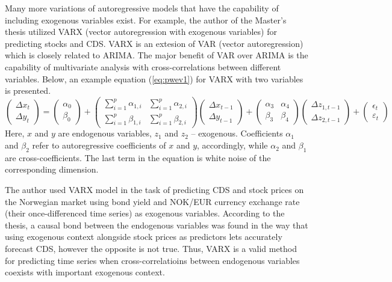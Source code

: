 \documentclass[3p,times,procedia]{elsarticle}
\begin{document}
Many more variations of autoregressive models that have the capability of including exogenous variables exist. For example, the author of the Master's thesis \cite{ding2021empirical} utilized VARX (vector autoregression with exogenous variables) for predicting stocks and CDS. VARX is an extesion of VAR (vector autoregression) which is closely related to ARIMA. The major benefit of VAR over ARIMA is the capability of multivariate analysis with cross-correlations between different variables. Below, an example equation (\ref{eq:pwev1}) for VARX with two variables is presented.
\begin{equation} \label{eq:pwev1}
\begin{pmatrix}\Delta x_t \\ \Delta y_t \end{pmatrix}
= \begin{pmatrix}\alpha_0 \\ \beta_0 \end{pmatrix}
+ \begin{pmatrix}\sum_{i=1}^p \alpha_{1,i} & \sum_{i=1}^p \alpha_{2,i} \\ \sum_{i=1}^p \beta_{1,i} & \sum_{i=1}^p \beta_{2,i} \end{pmatrix}
\begin{pmatrix}\Delta x_{t-1} \\ \Delta y_{t-1} \end{pmatrix}
+ \begin{pmatrix}\alpha_3 & \alpha_4 \\ \beta_3 & \beta_4 \end{pmatrix}
\begin{pmatrix}\Delta z_{1, t-1} \\ \Delta z_{2, t-1} \end{pmatrix}
+ \begin{pmatrix}\epsilon_t \\ \varepsilon_t \end{pmatrix}
\end{equation}
Here, $x$ and $y$ are endogenous variables, $z_1$ and $z_2$ -- exogenous. Coefficients $\alpha_1$ and $\beta_2$ refer to autoregressive coefficients of $x$ and $y$, accordingly, while $\alpha_2$ and $\beta_1$ are cross-coefficients. The last term in the equation is white noise of the corresponding dimension.

The author used VARX model in the task of predicting CDS and stock prices on the Norwegian market using bond yield and NOK/EUR currency exchange rate (their once-differenced time series) as exogenous variables. According to the thesis, a causal bond between the endogenous variables was found in the way that using exogenous context alongside stock prices as predictors lets accurately forecast CDS, however the opposite is not true. Thus, VARX is a valid method for predicting time series when cross-correlatioins between endogenous variables coexists with important exogenous context. 
\end{document}
